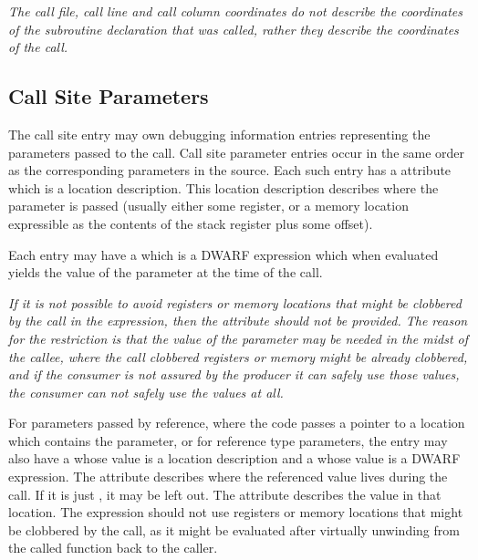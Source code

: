 \textit{The call file, call line and call column coordinates do 
not describe the coordinates of the subroutine declaration that 
was called, rather they describe the coordinates of the call.}

\subsection{Call Site Parameters}
\label{chap:callsiteparameters}
The call site entry may own 
\DWTAGcallsiteparameterTARG{} 
debugging information entries representing the parameters passed 
to the call.
Call site parameter entries occur in the same order as the 
corresponding parameters in the source.
Each such entry has a \DWATlocation{} attribute which is a location 
description. This location description 
describes where the parameter is passed
(usually either some register, or a memory location expressible as 
the contents of the stack register plus some offset).

Each \DWTAGcallsiteparameter{} entry may have a 
\DWATcallvalueDEFN{}
which is a DWARF expression 
which when evaluated yields the value of the parameter at the time of the call.

\textit{If it is not
possible to avoid registers or memory locations that might be clobbered by
the call in the expression, then the \DWATcallvalueNAME{} attribute should
not be provided. The reason for the restriction is that the value of the parameter may be
needed in the midst of the callee, where the call clobbered registers or
memory might be already clobbered, and if the consumer is not assured by
the producer it can safely use those values, the consumer can not safely
use the values at all.}

For parameters passed by reference, where the code passes a pointer to
a location which contains the parameter, or for reference type parameters,
the \DWTAGcallsiteparameter{} entry may also have a
\DWATcalldatalocationDEFN{}
whose value is a location description and a
\DWATcalldatavalueDEFN{}
whose value is a DWARF expression.  The \DWATcalldatalocationNAME{} attribute
describes where the referenced value lives during the call.  If it is just 
\DWOPpushobjectaddress{}, it may be left out.  The 
\DWATcalldatavalueNAME{} attribute describes the value in that location. 
The expression should not use registers or memory
locations that might be clobbered by the call, as it might be evaluated after 
virtually unwinding from the called function back to the caller.

